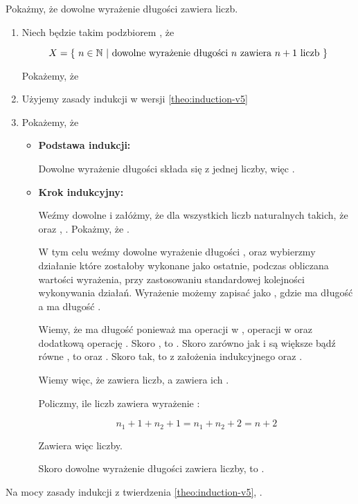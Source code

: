 \begin{example}
Pokażmy, że dowolne wyrażenie długości  zawiera  liczb.

\begin{enumerate}
    \item Niech  będzie takim podzbiorem , że
    
    \[
        X = \{\ n \in \mathbb{N}\ |\ \text{dowolne wyrażenie długości } n \text{ zawiera } n+1 \text{ liczb}\ \}
    \]
    
    Pokażemy, że 
    
    \item Użyjemy zasady indukcji w wersji \ref{theo:induction-v5}
    
    \item Pokażemy, że
    
    \begin{itemize}
        \item \textbf{Podstawa indukcji:} 
        
        Dowolne wyrażenie długości  składa się z jednej liczby, więc .
        
        \item \textbf{Krok indukcyjny:} 
        
        Weźmy dowolne  i załóżmy, że dla wszystkich liczb naturalnych  takich, że  oraz , . Pokażmy, że . 
        
        W tym celu weźmy dowolne wyrażenie \m{\varphi} długości , oraz wybierzmy działanie \m{\diamond} które zostałoby wykonane jako ostatnie, podczas obliczana wartości wyrażenia, przy zastosowaniu standardowej kolejności wykonywania działań. Wyrażenie \m{\varphi} możemy zapisać jako , gdzie  ma długość  a  ma długość . 
        
        Wiemy, że \m{\varphi} ma długość  ponieważ ma  operacji w ,  operacji w  oraz dodatkową operację \m{\diamond}. Skoro , to . Skoro zarówno  jak i  są większe bądź równe , to  oraz . Skoro tak, to z założenia indukcyjnego  oraz .
        
        Wiemy więc, że  zawiera  liczb, a  zawiera ich .
        
        Policzmy, ile liczb zawiera wyrażenie :
        
        \[
            n_1 + 1 + n_2 + 1 = n_1 + n_2 + 2 = n+2
        \]
        
        Zawiera więc  liczby.
        
        Skoro dowolne wyrażenie długości  zawiera  liczby, to .
    \end{itemize}
\end{enumerate}

Na mocy zasady indukcji z twierdzenia \ref{theo:induction-v5}, .
\end{example}

